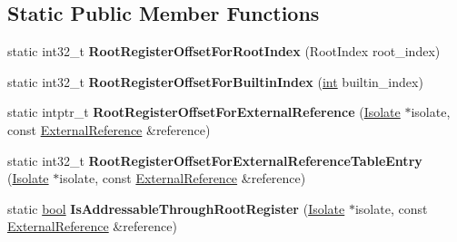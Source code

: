 \subsection*{Static Public Member Functions}
\begin{DoxyCompactItemize}
\item 
\mbox{\label{classv8_1_1internal_1_1TurboAssemblerBase_ab6454d00ffd134804cc4ac57d9e49b97}} 
static int32\+\_\+t {\bfseries Root\+Register\+Offset\+For\+Root\+Index} (Root\+Index root\+\_\+index)
\item 
\mbox{\label{classv8_1_1internal_1_1TurboAssemblerBase_a225bbd20dd637c4d4382dcdfcf4db7f0}} 
static int32\+\_\+t {\bfseries Root\+Register\+Offset\+For\+Builtin\+Index} (\mbox{\hyperlink{classint}{int}} builtin\+\_\+index)
\item 
\mbox{\label{classv8_1_1internal_1_1TurboAssemblerBase_a103e2216246e4b062e777d02241ee3c4}} 
static intptr\+\_\+t {\bfseries Root\+Register\+Offset\+For\+External\+Reference} (\mbox{\hyperlink{classv8_1_1internal_1_1Isolate}{Isolate}} $\ast$isolate, const \mbox{\hyperlink{classv8_1_1internal_1_1ExternalReference}{External\+Reference}} \&reference)
\item 
\mbox{\label{classv8_1_1internal_1_1TurboAssemblerBase_a9593562ce88203612b3dfb28cebbb40b}} 
static int32\+\_\+t {\bfseries Root\+Register\+Offset\+For\+External\+Reference\+Table\+Entry} (\mbox{\hyperlink{classv8_1_1internal_1_1Isolate}{Isolate}} $\ast$isolate, const \mbox{\hyperlink{classv8_1_1internal_1_1ExternalReference}{External\+Reference}} \&reference)
\item 
\mbox{\label{classv8_1_1internal_1_1TurboAssemblerBase_a99dc72e035ec1b2d266473e0bb9c364d}} 
static \mbox{\hyperlink{classbool}{bool}} {\bfseries Is\+Addressable\+Through\+Root\+Register} (\mbox{\hyperlink{classv8_1_1internal_1_1Isolate}{Isolate}} $\ast$isolate, const \mbox{\hyperlink{classv8_1_1internal_1_1ExternalReference}{External\+Reference}} \&reference)
\end{DoxyCompactItemize}
